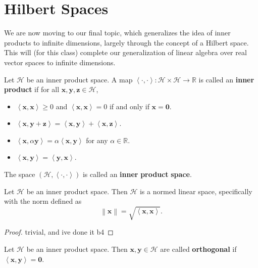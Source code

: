 \documentclass[11pt, letterpaper]{report}
\begin{document}
\section{Hilbert Spaces}
We are now moving to our final topic, which generalizes the idea of inner products to infinite dimensions, largely through the concept of a Hilbert space. This will (for this class) complete our generalization of linear algebra over real vector spaces to infinite dimensions.
\begin{definition}\label{dfn:2.33}
	Let $\mathcal{H} $ be an inner product space. A map $\left<\cdot ,\cdot  \right>: \mathcal{H} \times \mathcal{H}  \to \mathbb{R}$ is called an \textbf{inner} \textbf{product} if for all $\mathbf{x},\mathbf{y},\mathbf{z}\in \mathcal{H} $,
	\begin{itemize}
		\item $\left\langle \mathbf{x},\mathbf{x} \right\rangle \geq 0$ and $\left\langle \mathbf{x},\mathbf{x} \right\rangle =0$ if and only if $\mathbf{x}=\mathbf{0}$.
		\item $\left\langle \mathbf{x},\mathbf{y}+\mathbf{z} \right\rangle =\left\langle \mathbf{x},\mathbf{y} \right\rangle +\left\langle \mathbf{x},\mathbf{z} \right\rangle $.
		\item $\left\langle \mathbf{x},\alpha \mathbf{y} \right\rangle =\alpha \left\langle \mathbf{x},\mathbf{y} \right\rangle $ for any $\alpha \in\mathbb{R}$.
		\item $\left\langle \mathbf{x},\mathbf{y} \right\rangle =\left\langle \mathbf{y},\mathbf{x} \right\rangle $.
	\end{itemize}
	The space $\left( \mathcal{H} ,\left\langle \cdot ,\cdot  \right\rangle  \right) $ is called an \textbf{inner} \textbf{product} \textbf{space}.
\end{definition}
\begin{theorem}\label{thm:2.9}
	Let $\mathcal{H} $ be an inner product space. Then $\mathcal{H} $ is a normed linear space, specifically with the norm defined as
	\[
		\left\lVert \mathbf{x} \right\rVert =\sqrt{\left\langle \mathbf{x},\mathbf{x} \right\rangle } 
	.\]
\end{theorem}
\begin{proof}
	trivial, and ive done it b4
\end{proof}
\begin{definition}[Orthogonality]\label{dfn:2.34}
	Let $\mathcal{H} $ be an inner product space. Then $\mathbf{x},\mathbf{y}\in \mathcal{H} $ are called \textbf{orthogonal} if $\left\langle \mathbf{x},\mathbf{y} \right\rangle =\mathbf{0}$.
\end{definition}
\end{document}

